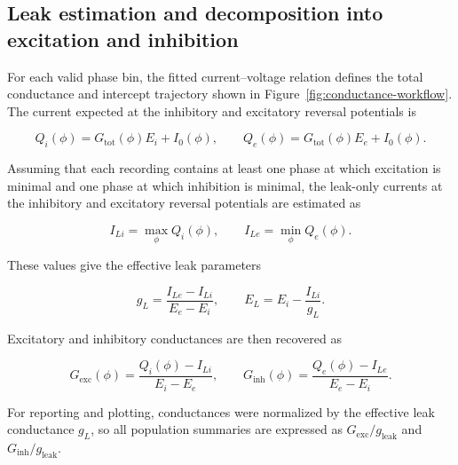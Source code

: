 \documentclass[
]{article}
\newcommand{\figref}[1]{Figure~\ref{#1}}
\begin{document}
\subsection{Leak estimation and decomposition into excitation and inhibition}\label{leak-estimation-and-decomposition-into-excitation-and-inhibition}

For each valid phase bin, the fitted current--voltage relation defines the total conductance and intercept trajectory shown in \figref{fig:conductance-workflow}. The current expected at the inhibitory and excitatory reversal potentials is

\begin{equation}
Q_i(\phi) = G_{\mathrm{tot}}(\phi)E_i + I_0(\phi), \qquad Q_e(\phi) = G_{\mathrm{tot}}(\phi)E_e + I_0(\phi).
\end{equation}

Assuming that each recording contains at least one phase at which excitation is minimal and one phase at which inhibition is minimal, the leak-only currents at the inhibitory and excitatory reversal potentials are estimated as

\begin{equation}
I_{Li} = \max_{\phi} Q_i(\phi), \qquad I_{Le} = \min_{\phi} Q_e(\phi).
\end{equation}

These values give the effective leak parameters

\begin{equation}
g_L = \frac{I_{Le}-I_{Li}}{E_e-E_i}, \qquad E_L = E_i - \frac{I_{Li}}{g_L}.
\end{equation}

Excitatory and inhibitory conductances are then recovered as

\begin{equation}
G_{\mathrm{exc}}(\phi) = \frac{Q_i(\phi)-I_{Li}}{E_i-E_e}, \qquad G_{\mathrm{inh}}(\phi) = \frac{Q_e(\phi)-I_{Le}}{E_e-E_i}.
\end{equation}

For reporting and plotting, conductances were normalized by the effective leak conductance \(g_L\), so all population summaries are expressed as \(G_{\mathrm{exc}}/g_{\mathrm{leak}}\) and \(G_{\mathrm{inh}}/g_{\mathrm{leak}}\).
\end{document}
